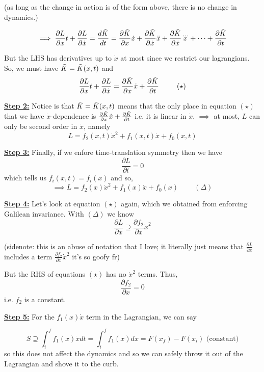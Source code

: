 \documentclass[11pt]{article}
\begin{document}
(as long as the change in action is of the form above, there is no change in dynamics.)

\[ \implies \frac{\partial L}{\partial x} t + \frac{\partial L}{\partial \dot{x}} = \frac{d \Tilde{K}}{dt} = \frac{\partial \Tilde{K}}{\partial x} \dot{x} +  \frac{\partial \Tilde{K}}{\partial \dot{x}} \ddot{x} + \frac{\partial \Tilde{K}}{\partial \ddot{x}} \dddot{x} + \cdots +  \frac{\partial \Tilde{K}}{\partial t}  \\ \]

\vskip 0.5cm
But the LHS has derivatives up to $\dot{x}$ at most since we restrict our lagrangians. So, we must have $\Tilde{K} = \Tilde{K}(x, t)$ and 
\[ \frac{\partial L}{\partial x} t + \frac{\partial L}{\partial \dot{x}} = \frac{\partial \Tilde{K}}{\partial x} \dot{x} + \frac{\partial \Tilde{K}}{\partial t} \;\;\;\;\;\;\;\;\; (\star)\]

\vskip 0.5cm
\textbf{\underline{Step 2:}} Notice is that $\Tilde{K} = \Tilde{K}(x, t)$ means that the only place in equation $(\star)$ that we have $\dot{x}$-dependence is $ \frac{\partial \Tilde{K}}{\partial x} \dot{x} + \frac{\partial \Tilde{K}}{\partial t}$ i.e. it is linear in $\dot{x}$.
\vskip 0.5cm
$\implies$ at most, $L$ can only be second order in $\dot{x}$, namely
\[ L = f_2(x,t) \dot{x}^2 + f_1(x,t) \dot{x} + f_0(x, t) \]

\textbf{\underline{Step 3:}} Finally, if we enfore time-translation symmetry then we have 
\[ \frac{\partial L}{\partial t} = 0  \]
which tells us $f_i(x, t) = f_i(x)$ and so,
\[ \implies L = f_2(x) \dot{x}^2 + f_1(x) \dot{x} + f_0(x) \;\;\;\;\;\;\;\; (\Delta) \]

\textbf{\underline{Step 4:}} Let's look at equation $(\star)$ again, which we obtained from enforcing Galilean invariance. With $(\Delta)$ we know 
\[ \frac{\partial L}{\partial x} \supseteq \frac{\partial f_2}{\partial x} \dot{x}^2 \]

(sidenote: this is an abuse of notation that I love; it literally just means that $\frac{\partial L}{\partial x}$ includes a term $\frac{\partial f_2}{\partial x} \dot{x}^2$ it's so goofy fr)

But the RHS of equations $(\star)$ has no $\dot{x}^2$ terms. Thus,
\[ \frac{\partial f_2}{\partial x} = 0 \] i.e. $f_2$ is a constant.

\vskip 0.5cm
\textbf{\underline{Step 5:}} For the $f_1(x) \dot{x}$ term in the Lagrangian, we can say 

\[ S \supseteq \int_{i}^{f} f_1(x) \dot{x} dt = \int_{i}^{f} f_1(x) dx = F(x_f) - F(x_i) \text{ (constant)}\] so this does not affect the dynamics and so we can safely throw it out of the Lagrangian and shove it to the curb.
\end{document}
